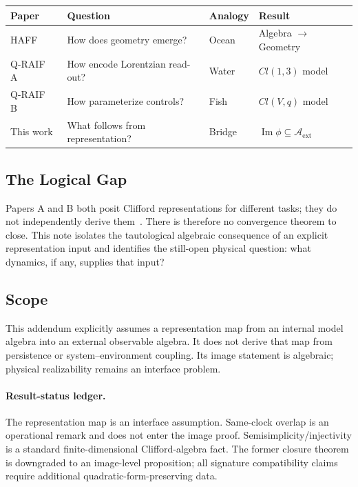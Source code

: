 \documentclass[12pt]{article}
\begin{document}
\begin{center}
\small
\begin{tabular}{@{}llll@{}}
\toprule
\textbf{Paper} & \textbf{Question} & \textbf{Analogy} & \textbf{Result} \\
\midrule
HAFF~\cite{Liu2026PaperA} & How does geometry emerge? & Ocean & Algebra $\to$ Geometry \\
Q-RAIF A~\cite{Liu2026QRAIF_A} & How encode Lorentzian read-out? & Water & $Cl(1,3)$ model \\
Q-RAIF B~\cite{Liu2026QRAIF_B} & How parameterize controls? & Fish & $Cl(V,q)$ model \\
This work & What follows from representation? & Bridge & $\operatorname{Im}\phi\subseteq\mathcal A_{\mathrm{ext}}$ \\
\bottomrule
\end{tabular}
\end{center}

\subsection{The Logical Gap}

Papers A and B both posit Clifford representations for different tasks; they do not independently derive them~\cite{Liu2026QRAIF_A,Liu2026QRAIF_B}.  There is therefore no convergence theorem to close.  This note isolates the tautological algebraic consequence of an explicit representation input and identifies the still-open physical question: what dynamics, if any, supplies that input?

\subsection{Scope}

This addendum explicitly assumes a representation map from an internal model algebra into an external observable algebra.  It does not derive that map from persistence or system--environment coupling.  Its image statement is algebraic; physical realizability remains an interface problem.

\paragraph{Result-status ledger.}
The representation map is an interface assumption.  Same-clock overlap is an operational remark and does not enter the image proof.  Semisimplicity/injectivity is a standard finite-dimensional Clifford-algebra fact.  The former closure theorem is downgraded to an image-level proposition; all signature compatibility claims require additional quadratic-form-preserving data.
\end{document}
